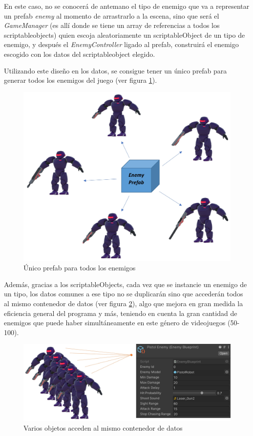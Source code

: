 En este caso, no se conocerá de antemano el tipo de enemigo que va a representar un prefab \textit{enemy} al momento de arrastrarlo a la escena, sino que será el \textit{GameManager} (es allí donde se tiene un array de referencias a todos los scriptableobjects) quien escoja aleatoriamente un scriptableObject de un tipo de enemigo, y después el \textit{EnemyController} ligado al prefab, construirá el enemigo escogido con los datos del scriptableobject elegido.   

Utilizando este diseño en los datos, se consigue tener un único prefab para generar todos los enemigos del juego (ver figura \ref{fig:PrefabEnemigos}).
\begin{figure}[h]
	\centering
	\includegraphics[scale=0.45]{img/EnemyPrefab.jpg}
	\caption{Único prefab para todos los enemigos}
	\label{fig:PrefabEnemigos}
    \end{figure}
Además, gracias a los scriptableObjects, cada vez que se instancie un enemigo de un tipo, los datos comunes a ese tipo no se duplicarán sino que accederán todos al mismo contenedor de datos (ver figura \ref{fig:PistolEnemyScriptableObject}), algo que mejora en gran medida la eficiencia general del programa y más, teniendo en cuenta la gran cantidad de enemigos que puede haber simultáneamente en este género de videojuegos (50-100).
\begin{figure}[h]
	\centering
	\includegraphics[scale=0.45]{img/PistolEnemyScriptableObject.jpg}
	\caption{Varios objetos acceden al mismo contenedor de datos}
	\label{fig:PistolEnemyScriptableObject}
    \end{figure}
